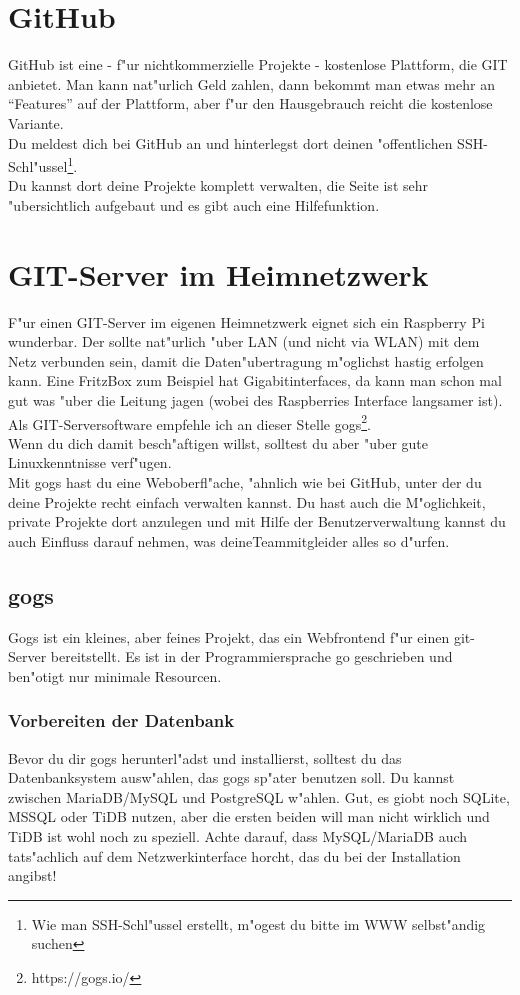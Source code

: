\documentclass[german,a4paper]{report}
\begin{document}
\section{GitHub}
GitHub ist eine - f"ur nichtkommerzielle Projekte - kostenlose Plattform, die GIT anbietet.
Man kann nat"urlich Geld zahlen, dann bekommt man etwas mehr an ``Features'' auf der Plattform,
aber f"ur den Hausgebrauch reicht die kostenlose Variante.\\
Du meldest dich bei GitHub an und hinterlegst dort deinen "offentlichen
SSH-Schl"ussel\footnote{Wie man SSH-Schl"ussel erstellt, m"ogest du bitte im WWW selbst"andig
suchen}.\\
Du kannst dort deine Projekte komplett verwalten, die Seite ist sehr "ubersichtlich
aufgebaut und es gibt auch eine Hilfefunktion.

\section{GIT-Server im Heimnetzwerk}
F"ur einen GIT-Server im eigenen Heimnetzwerk eignet sich ein Raspberry Pi wunderbar. Der
sollte nat"urlich "uber LAN (und nicht via WLAN) mit dem Netz verbunden sein, damit die
Daten"ubertragung m"oglichst hastig erfolgen kann. Eine FritzBox zum Beispiel hat
Gigabitinterfaces, da kann man schon mal gut was "uber die Leitung jagen (wobei des Raspberries
Interface langsamer ist).\\
Als GIT-Serversoftware empfehle ich an dieser Stelle gogs\footnote{https://gogs.io/}.\\
Wenn du dich damit besch"aftigen willst, solltest du aber "uber gute Linuxkenntnisse
verf"ugen.\\
Mit gogs hast du eine Weboberfl"ache, "ahnlich wie bei GitHub, unter der du deine Projekte
recht einfach verwalten kannst. Du hast auch die M"oglichkeit, private Projekte dort anzulegen
und mit Hilfe der Benutzerverwaltung kannst du auch Einfluss darauf nehmen, was deineTeammitgleider
alles so d"urfen.

\subsection{gogs}
Gogs ist ein kleines, aber feines Projekt, das ein Webfrontend f"ur einen git-Server bereitstellt.
Es ist in der Programmiersprache go geschrieben und ben"otigt nur minimale Resourcen.

\subsubsection{Vorbereiten der Datenbank}
Bevor du dir gogs herunterl"adst und installierst, solltest du das Datenbanksystem
ausw"ahlen, das gogs sp"ater benutzen soll. Du kannst zwischen MariaDB/MySQL und PostgreSQL
w"ahlen. Gut, es giobt noch SQLite, MSSQL oder TiDB nutzen, aber die ersten beiden will man
nicht wirklich und TiDB ist wohl noch zu speziell. Achte darauf, dass MySQL/MariaDB auch
tats"achlich auf dem Netzwerkinterface horcht, das du bei der Installation angibst!\\
\end{document}
